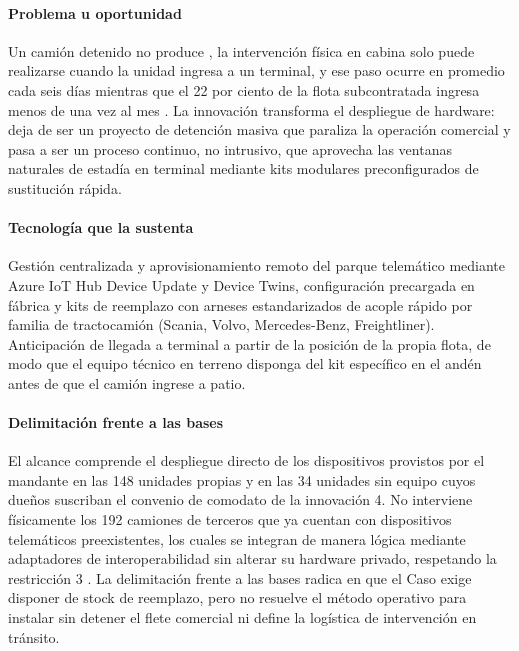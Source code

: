 
\paragraph{Problema u oportunidad} Un camión detenido no produce ,
la intervención física en cabina solo puede realizarse cuando la unidad ingresa a un terminal, y ese
paso ocurre en promedio cada seis días mientras que el 22 por ciento de la flota subcontratada ingresa
menos de una vez al mes . La innovación transforma el despliegue de hardware: deja
de ser un proyecto de detención masiva que paraliza la operación comercial y pasa a ser un proceso
continuo, no intrusivo, que aprovecha las ventanas naturales de estadía en terminal mediante kits
modulares preconfigurados de sustitución rápida.

\paragraph{Tecnología que la sustenta} Gestión centralizada y aprovisionamiento remoto del parque
telemático mediante Azure IoT Hub Device Update y Device Twins, configuración precargada en fábrica y
kits de reemplazo con arneses estandarizados de acople rápido por familia de tractocamión (Scania,
Volvo, Mercedes-Benz, Freightliner). Anticipación de llegada a terminal a partir de la posición de la
propia flota, de modo que el equipo técnico en terreno disponga del kit específico en el andén antes de
que el camión ingrese a patio.

\paragraph{Delimitación frente a las bases} El alcance comprende el despliegue directo de los
dispositivos provistos por el mandante en las 148 unidades propias y en las 34 unidades sin equipo
cuyos dueños suscriban el convenio de comodato de la innovación 4. No interviene físicamente los 192
camiones de terceros que ya cuentan con dispositivos telemáticos preexistentes, los cuales se integran
de manera lógica mediante adaptadores de interoperabilidad sin alterar su hardware privado, respetando la restricción 3 . La
delimitación frente a las bases radica en que el Caso exige disponer de stock de reemplazo, pero no
resuelve el método operativo para instalar sin detener el flete comercial ni define la logística de
intervención en tránsito.

